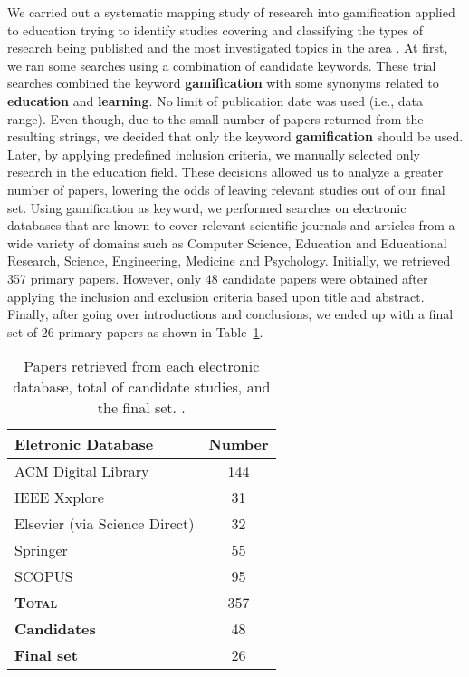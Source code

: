 We carried out a systematic mapping study of research into gamification applied to education trying to identify studies covering and classifying the types of research being published and the most investigated topics in the area \cite{Borges2014SAC}. At first, we ran some searches using a combination of candidate keywords. These trial searches combined the keyword \textbf{gamification} with some synonyms related to \textbf{education} and \textbf{learning}. No limit of publication date was used (i.e., data range). Even though, due to the  small number of papers returned from the resulting strings, we decided that only the keyword \textbf{gamification} should be used. Later, by applying predefined inclusion  criteria, we manually selected only research in the education field. 
These decisions allowed us to analyze a greater number of papers, lowering the odds of leaving relevant studies out of our final set. Using gamification as keyword, we performed searches on electronic databases that are known to cover relevant scientific journals and articles from a wide variety of domains such as Computer Science, Education and Educational Research, Science, Engineering, Medicine and Psychology. Initially, we retrieved 357 primary papers. However, only 48 candidate papers were obtained after applying the inclusion and exclusion criteria based upon title and abstract. Finally, after going over introductions and conclusions, we ended up with a final set of 26 primary papers as shown in Table~\ref{tab:visao_geral_busca}. 

\begin{table}
[ht] \caption {Papers retrieved from each electronic
database, total of candidate studies, and the final
set.
. } \label{tab:visao_geral_busca} 
	\begin{center}
		\begin{tabular}
			{ | l | c | } 
				\hline\hline \textbf {Eletronic Database}  & \textbf{Number} \\
                \hline {ACM Digital Library} & 144 \\
				\hline {IEEE Xxplore} & 31 \\
				\hline {Elsevier (via Science Direct)} & 32  \\
				\hline {Springer} & 55 \\
                \hline {SCOPUS} & 95 \\
			\hline \hline \textsc{\textbf{Total}} & 357 \\
			\hline \textbf{Candidates} & 48 \\
			\hline \textbf{Final set} & 26 \\
			\hline\hline 
		\end{tabular}
	\end{center}
\end{table}

